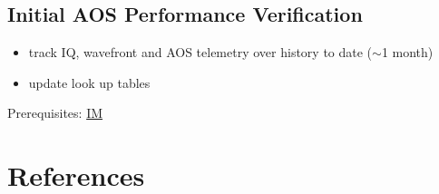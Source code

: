 \documentclass[SE,authoryear,toc]{lsstdoc}
\newcommand{\IM}[1]{\hyperref[IM:#1]{\color{blue}IM$_{\text{\csname nameIM#1\endcsname}}$}\gdef\thisIM{#1}}
\begin{document}
\subsection{Initial AOS Performance Verification}

\begin{itemize}
\item track IQ, wavefront and AOS telemetry over history to date ($\sim$1 month)
\item update look up tables
\end{itemize}
Prerequisites: \IM{b}

\section{References} \label{sec:bib}
\renewcommand{\refname}{} %


%
\printglossaries
\end{document}
